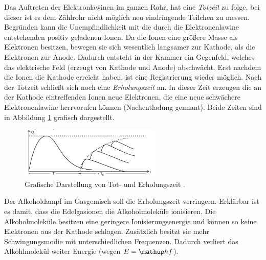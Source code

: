 Das Auftreten der Elektronlawinen im ganzen Rohr, hat eine \emph{Totzeit} zu folge,
bei dieser ist es dem Zählrohr nicht möglich neu eindringende Teilchen
zu messen. Begründen kann die Unempfindlichkeit mit die durch die Elektronenlawine entstehenden
positiv geladenen Ionen. Da die Ionen eine größere Masse als Elektronen besitzen,
bewegen sie sich wesentlich langsamer zur Kathode, als die Elektronen
zur Anode. Dadurch entsteht in der Kammer ein Gegenfeld, welches das
elektrische Feld (erzeugt von Kathode und Anode) abschwächt.
Erst nachdem die Ionen die Kathode erreicht haben, ist eine
Registrierung wieder möglich. Nach der Totzeit schließt sich
noch eine \emph{Erholungszeit} an. In dieser Zeit erzeugen
die an der Kathode eintreffenden Ionen neue Elektronen, die eine neue
schwächere Elektronenlawine herrvorufen können (Nachentladung gennant). Beide Zeiten sind
in Abbildung \ref{fig: tot_und_erholungszeit} grafisch dargestellt.
\begin{figure}
  \centering
  \includegraphics[width=0.6\textwidth]{bilder/totzeit.png}
  \caption{Grafische Darstellung von Tot- und Erholungszeit \cite{anleitung703}.}
  \label{fig: tot_und_erholungszeit}
  \end{figure}

Der Alkoholdampf im Gasgemisch soll die Erholungszeit verringern. Erklärbar ist es damit, dass
die Edelgasionen die Alkoholmoleküle ionisieren. Die Alkoholmoleküle
besitzen eine geringere Ionisierungsenergie und können so keine Elektronen aus
der Kathode schlagen. Zusätzlich besitzt sie mehr Schwingungsmodie
mit unterschiedlichen Frequenzen. Dadurch verliert das Alkohlmolekül
weiter Energie (wegen $E=\map{h}f$).

